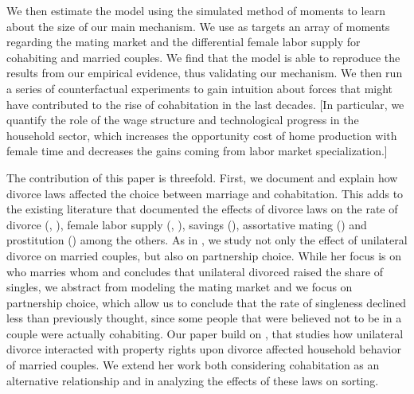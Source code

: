 \documentclass[12pt]{article}
\numberwithin{table}{section}
\begin{document}
We then estimate the model using the simulated method of moments to learn about the size of our main mechanism. We use as targets an array of moments regarding the mating market and the differential female labor supply for cohabiting and married couples. We find that the model is able to reproduce the results from our empirical evidence, thus validating our mechanism. We then run a series of counterfactual experiments to gain intuition about forces that might have contributed to the rise of cohabitation in the last decades. [In particular, we quantify the role of the wage structure and technological progress in the household sector, which increases the opportunity cost of home production with female time and decreases the gains coming from labor market specialization.]

The contribution of this paper is threefold. First, we document and explain how divorce laws affected the choice between marriage and cohabitation. This adds to the existing literature that documented the effects of divorce laws on the rate of divorce (\citealp{friedberg1998}, \citealp{wolfers2006}), female labor supply (\citealp{stevenson2008}, \citealp{voena2015}), savings (\citealp{voena2015}), assortative mating (\citealp{reynoso2019}) and prostitution (\citealp{ciacci2017}) among the others. As in \cite{reynoso2019}, we study not only the effect of unilateral divorce on married couples, but also on partnership choice. While her focus is on who marries whom and concludes that unilateral divorced raised the share of singles, we abstract from modeling the mating market and we focus on partnership choice, which allow us to conclude that the rate of singleness declined less than previously thought, since some people that were believed not to be in a couple were actually cohabiting. Our paper build on \cite{voena2015}, that studies how unilateral divorce interacted with property rights upon divorce affected household behavior of married couples. We extend her work both considering cohabitation as an alternative relationship and in analyzing the effects of these laws on sorting.
\end{document}
